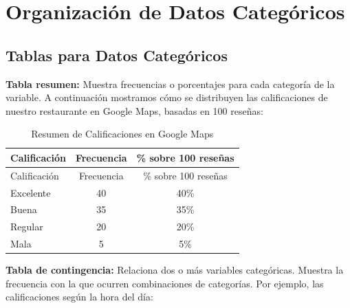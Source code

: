 \documentclass[
  spanish,
  letterpaper,
  DIV=11,
  numbers=noendperiod]{scrreprt}
\begin{document}
\section{Organización de Datos
Categóricos}\label{organizaciuxf3n-de-datos-categuxf3ricos}

\subsection{Tablas para Datos
Categóricos}\label{tablas-para-datos-categuxf3ricos}

\textbf{Tabla resumen:} Muestra frecuencias o porcentajes para cada
categoría de la variable. A continuación mostramos cómo se distribuyen
las calificaciones de nuestro restaurante en Google Maps, basadas en 100
reseñas:

\begin{longtable}[]{@{}lcc@{}}
\caption{Resumen de Calificaciones en Google
Maps}\label{tbl-calificaciones}\tabularnewline
\toprule\noalign{}
Calificación & Frecuencia & \% sobre 100 reseñas \\
\midrule\noalign{}
\endfirsthead
\toprule\noalign{}
Calificación & Frecuencia & \% sobre 100 reseñas \\
\midrule\noalign{}
\endhead
\bottomrule\noalign{}
\endlastfoot
Excelente & 40 & 40\% \\
Buena & 35 & 35\% \\
Regular & 20 & 20\% \\
Mala & 5 & 5\% \\
\end{longtable}

\textbf{Tabla de contingencia:} Relaciona dos o más variables
categóricas. Muestra la frecuencia con la que ocurren combinaciones de
categorías. Por ejemplo, las calificaciones según la hora del día:
\end{document}
